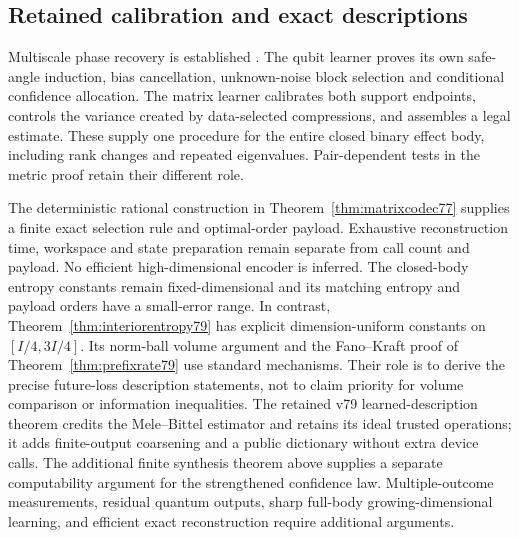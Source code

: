 \subsection{Retained calibration and exact descriptions}
Multiscale phase recovery is established \cite{HB76,KLY76}.
The qubit learner proves its own safe-angle induction, bias
cancellation, unknown-noise block selection and conditional
confidence allocation. The matrix learner calibrates both support
endpoints, controls the variance created by data-selected
compressions, and assembles a legal estimate. These supply one
procedure for the entire closed binary effect body, including
rank changes and repeated eigenvalues. Pair-dependent tests in the
metric proof retain their different role.

The deterministic rational construction in
Theorem~\ref{thm:matrixcodec77} supplies a finite exact selection
rule and optimal-order payload. Exhaustive reconstruction time,
workspace and state preparation remain separate from call count
and payload. No efficient high-dimensional encoder is inferred.
The closed-body entropy constants remain fixed-dimensional and its
matching entropy and payload orders have a small-error range.
In contrast, Theorem~\ref{thm:interiorentropy79} has explicit
dimension-uniform constants on $[I/4,3I/4]$. Its norm-ball volume
argument and the Fano--Kraft proof of
Theorem~\ref{thm:prefixrate79} use standard mechanisms. Their role
is to derive the precise future-loss description statements, not to
claim priority for volume comparison or information inequalities.
The retained v79 learned-description theorem credits the Mele--Bittel
estimator and retains its ideal trusted operations; it adds
finite-output coarsening and a public dictionary without extra
device calls. The additional finite synthesis theorem above supplies
a separate computability argument for the strengthened confidence law.
Multiple-outcome measurements, residual quantum outputs, sharp
full-body growing-dimensional learning, and efficient exact
reconstruction require additional arguments.
